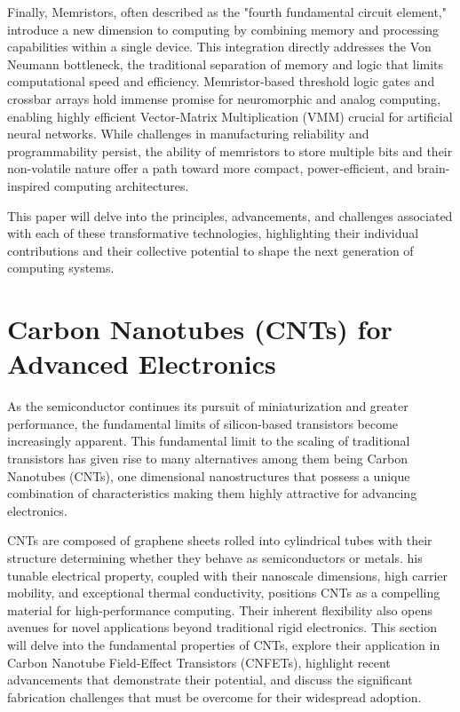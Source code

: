 \documentclass[sigconf,authordraft]{acmart}
\begin{document}
Finally, Memristors, often described as the "fourth fundamental 
circuit element," introduce a new dimension to computing by 
combining memory and processing capabilities within a single 
device. This integration directly addresses the Von Neumann 
bottleneck, the traditional separation of memory and logic that 
limits computational speed and efficiency. Memristor-based 
threshold logic gates and crossbar arrays hold immense promise 
for neuromorphic and analog computing, enabling highly efficient 
Vector-Matrix Multiplication (VMM) crucial for artificial neural 
networks. While challenges in manufacturing reliability and 
programmability persist, the ability of memristors to store 
multiple bits and their non-volatile nature offer a path toward 
more compact, power-efficient, and brain-inspired computing 
architectures.

This paper will delve into the principles, advancements, and 
challenges associated with each of these transformative technologies, 
highlighting their individual contributions and their collective 
potential to shape the next generation of computing systems.

\section{Carbon Nanotubes (CNTs) for Advanced Electronics}
As the semiconductor continues its pursuit of miniaturization 
and greater performance, the fundamental limits of silicon-based 
transistors become increasingly apparent. This fundamental limit to 
the scaling of traditional transistors has given rise to many 
alternatives among them being Carbon Nanotubes (CNTs), one 
dimensional nanostructures that possess a unique combination of 
characteristics making them highly attractive for advancing 
electronics.

CNTs are composed of graphene sheets rolled into cylindrical tubes
with their structure determining whether they behave as
semiconductors or metals. his tunable electrical property,
coupled with their nanoscale dimensions, 
high carrier mobility, and exceptional thermal conductivity, 
positions CNTs as a compelling material for high-performance 
computing. Their inherent flexibility also opens avenues for 
novel applications beyond traditional rigid electronics. 
This section will delve into the fundamental properties of 
CNTs, explore their application in Carbon Nanotube Field-Effect 
Transistors (CNFETs), highlight recent advancements that 
demonstrate their potential, and discuss the significant 
fabrication challenges that must be overcome for their widespread 
adoption.
\end{document}

